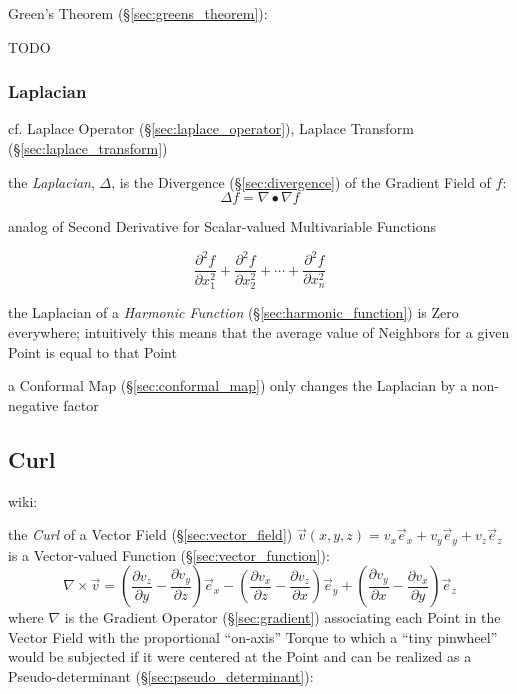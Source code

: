 {Green's Theorem (\S\ref{sec:greens_theorem}):

TODO



\subsubsection{Laplacian}\label{sec:laplacian}

\fist cf. Laplace Operator (\S\ref{sec:laplace_operator}), Laplace Transform
(\S\ref{sec:laplace_transform}) %

the \emph{Laplacian}, $\Delta$, is the Divergence (\S\ref{sec:divergence}) of
the Gradient Field of $f$:
\[
  \Delta f = \nabla \bullet \nabla f
\]

analog of Second Derivative for Scalar-valued Multivariable Functions

\[
  \frac{\partial^2 f}{\partial{x_1^2}} +
  \frac{\partial^2 f}{\partial{x_2^2}} +
  \cdots +
  \frac{\partial^2 f}{\partial{x_n^2}}
\]

the Laplacian of a \emph{Harmonic Function} (\S\ref{sec:harmonic_function}) is
Zero everywhere; intuitively this means that the average value of Neighbors for
a given Point is equal to that Point

a Conformal Map (\S\ref{sec:conformal_map}) only changes the Laplacian by a
non-negative factor



\subsection{Curl}\label{sec:curl}

wiki:

the \emph{Curl} of a Vector Field (\S\ref{sec:vector_field}) $\vec{v}(x,y,z) =
v_x\vec{e}_x + v_y\vec{e}_y + v_z\vec{e}_z$ is a Vector-valued Function
(\S\ref{sec:vector_function}):
\[
  \nabla\times\vec{v} =
    (\frac{\partial v_z}{\partial y}-\frac{\partial v_y}{\partial z})\vec{e}_x -
    (\frac{\partial v_x}{\partial z}-\frac{\partial v_z}{\partial x})\vec{e}_y +
    (\frac{\partial v_y}{\partial x}-\frac{\partial v_x}{\partial y})\vec{e}_z
\]
where $\nabla$ is the Gradient Operator (\S\ref{sec:gradient}) associating each
Point in the Vector Field with the proportional ``on-axis'' Torque to which a
``tiny pinwheel'' would be subjected if it were centered at the Point and can
be realized as a Pseudo-determinant (\S\ref{sec:pseudo_determinant}):

}
